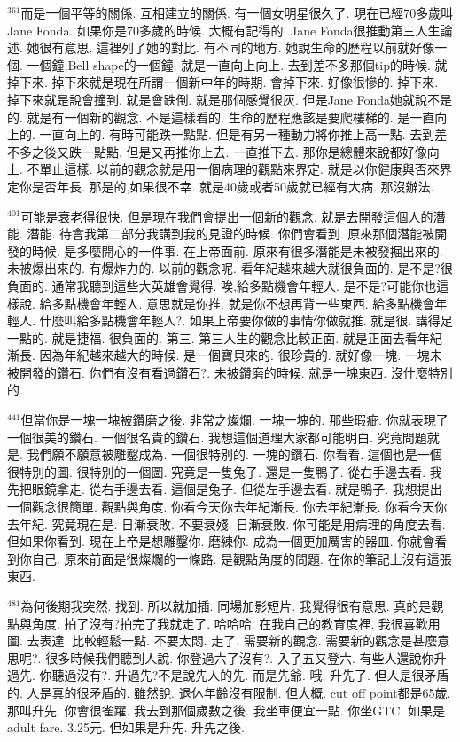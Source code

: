 \documentclass{book}
\begin{document}
$^{361}$而是一個平等的關係.
互相建立的關係.
有一個女明星很久了.
現在已經70多歲叫Jane Fonda.
如果你是70多歲的時候.
大概有記得的.
Jane Fonda很推動第三人生論述.
她很有意思.
這裡列了她的對比.
有不同的地方.
她說生命的歷程以前就好像一個.
一個鐘,Bell shape的一個鐘.
就是一直向上向上.
去到差不多那個tip的時候.
就掉下來.
掉下來就是現在所謂一個新中年的時期.
會掉下來.
好像很慘的.
掉下來.
掉下來就是說會撞到.
就是會跌倒.
就是那個感覺很灰.
但是Jane Fonda她就說不是的.
就是有一個新的觀念.
不是這樣看的.
生命的歷程應該是要爬樓梯的.
是一直向上的.
一直向上的.
有時可能跌一點點.
但是有另一種動力將你推上高一點.
去到差不多之後又跌一點點.
但是又再推你上去.
一直推下去.
那你是總體來說都好像向上.
不單止這樣.
以前的觀念就是用一個病理的觀點來界定.
就是以你健康與否來界定你是否年長.
那是的,如果很不幸.
就是40歲或者50歲就已經有大病.
那沒辦法.

$^{401}$可能是衰老得很快.
但是現在我們會提出一個新的觀念.
就是去開發這個人的潛能.
潛能.
待會我第二部分我講到我的見證的時候.
你們會看到.
原來那個潛能被開發的時候.
是多麼開心的一件事.
在上帝面前.
原來有很多潛能是未被發掘出來的.
未被爆出來的.
有爆炸力的.
以前的觀念呢.
看年紀越來越大就很負面的.
是不是?很負面的.
通常我聽到這些大英雄會覺得.
唉,給多點機會年輕人.
是不是?可能你也這樣說.
給多點機會年輕人.
意思就是你推.
就是你不想再背一些東西.
給多點機會年輕人.
什麼叫給多點機會年輕人?.
如果上帝要你做的事情你做就推.
就是很.
講得足一點的.
就是捷福.
很負面的.
第三.
第三人生的觀念比較正面.
就是正面去看年紀漸長.
因為年紀越來越大的時候.
是一個寶貝來的.
很珍貴的.
就好像一塊.
一塊未被開發的鑽石.
你們有沒有看過鑽石?.
未被鑽磨的時候.
就是一塊東西.
沒什麼特別的.

$^{441}$但當你是一塊一塊被鑽磨之後.
非常之燦爛.
一塊一塊的.
那些瑕疵.
你就表現了一個很美的鑽石.
一個很名貴的鑽石.
我想這個道理大家都可能明白.
究竟問題就是.
我們願不願意被雕鑿成為.
一個很特別的.
一塊的鑽石.
你看看.
這個也是一個很特別的圖.
很特別的一個圖.
究竟是一隻兔子.
還是一隻鴨子.
從右手邊去看.
我先把眼鏡拿走.
從右手邊去看.
這個是兔子.
但從左手邊去看.
就是鴨子.
我想提出一個觀念很簡單.
觀點與角度.
你看今天你去年紀漸長.
你去年紀漸長.
你看今天你去年紀.
究竟現在是.
日漸衰敗.
不要衰殘.
日漸衰敗.
你可能是用病理的角度去看.
但如果你看到.
現在上帝是想雕鑿你.
磨練你.
成為一個更加厲害的器皿.
你就會看到你自己.
原來前面是很燦爛的一條路.
是觀點角度的問題.
在你的筆記上沒有這張東西.

$^{481}$為何後期我突然.
找到.
所以就加插.
同場加影短片.
我覺得很有意思.
真的是觀點與角度.
拍了沒有?拍完了我就走了.
哈哈哈.
在我自己的教育度裡.
我很喜歡用圖.
去表達.
比較輕鬆一點.
不要太悶.
走了.
需要新的觀念.
需要新的觀念是甚麼意思呢?.
很多時候我們聽到人說.
你登過六了沒有?.
入了五又登六.
有些人還說你升過先.
你聽過沒有?.
升過先?不是說先人的先.
而是先爺.
哦.
升先了.
但人是很矛盾的.
人是真的很矛盾的.
雖然說.
退休年齡沒有限制.
但大概.
cut off point都是65歲.
那叫升先.
你會很雀躍.
我去到那個歲數之後.
我坐車便宜一點.
你坐GTC.
如果是adult fare.
3.25元.
但如果是升先.
升先之後.
\end{document}
